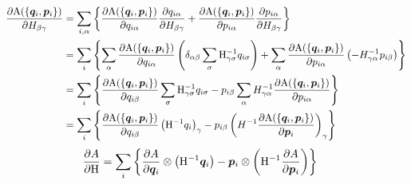 \documentclass[11pt,a4paper,uplatex]{jsarticle}
\begin{document}
\begin{align}
    \frac{\partial {\rm A}(\{\bm{q}_{i}, \bm{p}_{i}\})}{\partial H_{\beta \gamma}}  &= \sum_{i, \alpha} \left\{ \frac{\partial {\rm A}(\{\bm{q}_{i}, \bm{p}_{i}\})}{\partial q_{i \alpha}} \frac{\partial q_{i \alpha}}{\partial H_{\beta \gamma}} 
    +  \frac{\partial {\rm A}(\{\bm{q}_{i}, \bm{p}_{i}\})}{\partial p_{i \alpha}} \frac{\partial p_{i \alpha}}{\partial H_{\beta \gamma}} \right\} \\
    &= \sum_{i} \left\{ \sum_{\alpha} \frac{\partial {\rm A}(\{\bm{q}_{i}, \bm{p}_{i}\})}{\partial q_{i \alpha}} \left( \delta_{\alpha \beta} \sum_{\sigma} {\rm H}^{-1}_{\gamma \sigma} q_{i \sigma} \right) + \sum_{\alpha} \frac{\partial {\rm A}(\{\bm{q}_{i}, \bm{p}_{i}\})}{\partial p_{i \alpha}} \left(-H_{\gamma \alpha}^{-1} p_{i\beta} \right) \right\} \\
    &= \sum_{i} \left\{ \frac{\partial {\rm A}(\{\bm{q}_{i}, \bm{p}_{i}\})}{\partial q_{i \beta}} \sum_{\sigma} {\rm H}^{-1}_{\gamma \sigma} q_{i \sigma} 
    -  p_{i\beta} \sum_{\alpha} H_{\gamma \alpha}^{-1} \frac{\partial {\rm A}(\{\bm{q}_{i}, \bm{p}_{i}\})}{\partial p_{i \alpha}} \right\} \\
    &= \sum_{i} \left\{ \frac{\partial {\rm A}(\{\bm{q}_{i}, \bm{p}_{i}\})}{\partial q_{i \beta}} \left({\rm H}^{-1} q_{i}\right)_{\gamma}
    -  p_{i \beta} \left( H^{-1} \frac{\partial {\rm A}(\{\bm{q}_{i}, \bm{p}_{i}\})}{\partial \bm{p}_{i}}  \right)_{\gamma} \right\}
\end{align}
\begin{align}
    \frac{\partial A}{\partial {\rm H}} &= \sum_{i} \left\{
    \frac{\partial A}{\partial \bm{q}_{i}} \otimes \left({\rm H}^{-1} \bm{q}_{i}\right)
    -  \bm{p}_{i} \otimes \left( {\rm H^{-1}} \frac{\partial A}{\partial \bm{p}_{i}}  \right) 
    \right\}
\end{align}
\end{document}
